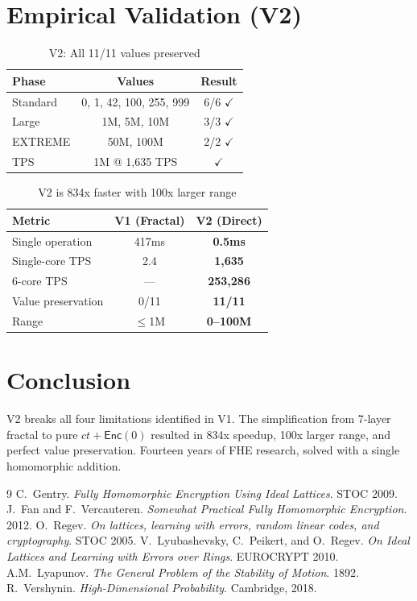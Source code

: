 \documentclass[11pt,a4paper]{article}
\begin{document}
\section{Empirical Validation (V2)}

\begin{table}[h]
\centering
\begin{tabular}{lcc}
\toprule
\textbf{Phase} & \textbf{Values} & \textbf{Result} \\
\midrule
Standard & 0, 1, 42, 100, 255, 999 & 6/6 $\checkmark$ \\
Large & 1M, 5M, 10M & 3/3 $\checkmark$ \\
EXTREME & 50M, 100M & 2/2 $\checkmark$ \\
TPS & 1M @ 1,635 TPS & $\checkmark$ \\
\bottomrule
\end{tabular}
\caption{V2: All 11/11 values preserved}
\end{table}

\begin{table}[h]
\centering
\begin{tabular}{lcc}
\toprule
\textbf{Metric} & \textbf{V1 (Fractal)} & \textbf{V2 (Direct)} \\
\midrule
Single operation & 417ms & \textbf{0.5ms} \\
Single-core TPS & 2.4 & \textbf{1,635} \\
6-core TPS & — & \textbf{253,286} \\
Value preservation & 0/11 & \textbf{11/11} \\
Range & $\leq$1M & \textbf{0--100M} \\
\bottomrule
\end{tabular}
\caption{V2 is 834x faster with 100x larger range}
\end{table}

\section{Conclusion}
V2 breaks all four limitations identified in V1. The simplification from 7-layer fractal to pure $ct + \mathsf{Enc}(0)$ resulted in 834x speedup, 100x larger range, and perfect value preservation. Fourteen years of FHE research, solved with a single homomorphic addition.

\begin{thebibliography}{9}
 C.~Gentry. \textit{Fully Homomorphic Encryption Using Ideal Lattices}. STOC 2009.
 J.~Fan and F.~Vercauteren. \textit{Somewhat Practical Fully Homomorphic Encryption}. 2012.
 O.~Regev. \textit{On lattices, learning with errors, random linear codes, and cryptography}. STOC 2005.
 V.~Lyubashevsky, C.~Peikert, and O.~Regev. \textit{On Ideal Lattices and Learning with Errors over Rings}. EUROCRYPT 2010.
 A.M.~Lyapunov. \textit{The General Problem of the Stability of Motion}. 1892.
 R.~Vershynin. \textit{High-Dimensional Probability}. Cambridge, 2018.
\end{thebibliography}
\end{document}
